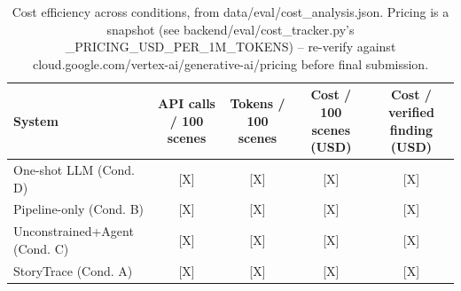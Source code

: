 \begin{table}[h]
\centering
\begin{tabular}{lcccc}
\hline
System & API calls / 100 scenes & Tokens / 100 scenes & Cost / 100 scenes (USD) & Cost / verified finding (USD) \\
\hline
One-shot LLM (Cond. D) & [X] & [X] & [X] & [X] \\
Pipeline-only (Cond. B) & [X] & [X] & [X] & [X] \\
Unconstrained+Agent (Cond. C) & [X] & [X] & [X] & [X] \\
StoryTrace (Cond. A) & [X] & [X] & [X] & [X] \\
\hline
\end{tabular}
\caption{Cost efficiency across conditions, from data/eval/cost\_analysis.json.
Pricing is a snapshot (see backend/eval/cost\_tracker.py's
\_PRICING\_USD\_PER\_1M\_TOKENS) -- re-verify against
cloud.google.com/vertex-ai/generative-ai/pricing before final submission.}
\label{tab:cost-efficiency}
\end{table}
